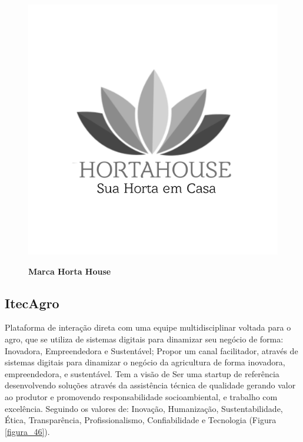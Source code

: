 \begin{figure}[H]
\centering
\caption{\textbf{Marca Horta House}}
\includegraphics[scale=0.1]{Imagens/hortahouse.png}
\label{figura_25}
\end{figure}



\subsection{ItecAgro}

Plataforma de interação direta com uma equipe multidisciplinar voltada
para o agro, que se utiliza de sistemas digitais para dinamizar seu negócio de forma: Inovadora, Empreendedora e Sustentável; Propor um canal facilitador, através de sistemas digitais para dinamizar o negócio da agricultura de forma inovadora, empreendedora, e sustentável.
Tem a visão de Ser uma startup de referência desenvolvendo soluções através da assistência técnica de qualidade gerando valor ao produtor e promovendo responsabilidade socioambiental, e trabalho com excelência.
Seguindo os valores de: Inovação, Humanização, Sustentabilidade, Ética, Transparência, Profissionalismo, Confiabilidade e Tecnologia (Figura \ref{figura_46}).

